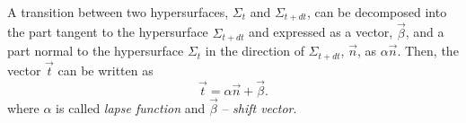A transition between two hypersurfaces, $\Sigma_t$ and $\Sigma_{t+dt}$, can be decomposed 
into the part tangent to the hypersurface 
$\Sigma_{t+dt}$ and expressed as a vector, $\vec{\beta}$, and a part normal 
to the hypersurface $\Sigma_t$ in the direction of $\Sigma_{t+dt}$, $\vec{n}$,  
as $\alpha \vec{n}$.%
%
Then, the vector $\vec{t}$ can be written as 
%
\begin{equation*}
\vec{t} = \alpha\vec{n}+\vec{\beta}.
\end{equation*}
%
where $\alpha$ is called \textit{lapse function} and $\vec{\beta}$ -- \textit{shift vector}.
%
%
%
% 

